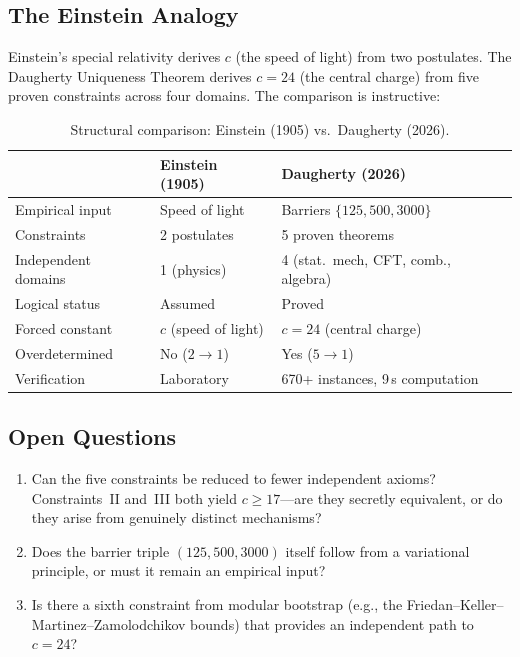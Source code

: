 \documentclass[12pt,a4paper]{article}
\theoremstyle{definition}
\theoremstyle{remark}
\begin{document}
\subsection{The Einstein Analogy}

Einstein's special relativity derives $c$ (the speed of light) from two postulates.  The Daugherty Uniqueness Theorem derives $c = 24$ (the central charge) from five proven constraints across four domains.  The comparison is instructive:

\begin{table}[H]
\centering
\caption{Structural comparison: Einstein (1905) vs.\ Daugherty (2026).}
\label{tab:einstein}
\begin{tabular}{@{}lll@{}}
\toprule
& \textbf{Einstein (1905)} & \textbf{Daugherty (2026)} \\
\midrule
Empirical input & Speed of light & Barriers $\{125, 500, 3000\}$ \\
Constraints & 2 postulates & 5 proven theorems \\
Independent domains & 1 (physics) & 4 (stat.\ mech, CFT, comb., algebra) \\
Logical status & Assumed & Proved \\
Forced constant & $c$ (speed of light) & $c = 24$ (central charge) \\
Overdetermined & No ($2 \to 1$) & Yes ($5 \to 1$) \\
Verification & Laboratory & 670+ instances, 9\,s computation \\
\bottomrule
\end{tabular}
\end{table}

\subsection{Open Questions}

\begin{enumerate}[label=(\roman*)]
\item Can the five constraints be reduced to fewer independent axioms?  Constraints~II and~III both yield $c \ge 17$---are they secretly equivalent, or do they arise from genuinely distinct mechanisms?

\item Does the barrier triple $(125, 500, 3000)$ itself follow from a variational principle, or must it remain an empirical input?

\item Is there a sixth constraint from modular bootstrap (e.g., the Friedan--Keller--Martinez--Zamolodchikov bounds) that provides an independent path to $c = 24$?
\end{enumerate}
\end{document}
